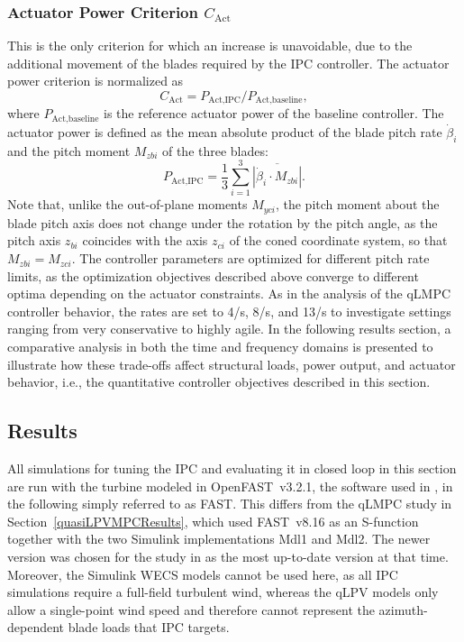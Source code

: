 \subsubsection*{Actuator Power Criterion $C_{\text{Act}}$}
This is the only criterion for which an increase is unavoidable, due to the additional movement of the blades required by the IPC controller. The actuator power criterion is normalized as
\begin{equation} \label{eq:CAct}
    C_{\text{Act}} = P_{\text{Act}, \text{IPC}}/P_{\text{Act}, \text{baseline}},
\end{equation}
where \( P_{\text{Act}, \text{baseline}} \) is the reference actuator power of the baseline controller. The actuator power is defined as the mean absolute product of the blade pitch rate $\dot{\beta}_i$ and the pitch moment $M_{zbi}$ of the three blades:
\begin{equation} \label{eq:CAct_calc}
    P_{\text{Act}, \text{IPC}} = \frac{1}{3} \sum_{i=1}^3 \overline{|\dot{\beta}_i \cdot M_{zbi}|}.
\end{equation}
%
Note that, unlike the out-of-plane moments $M_{yci}$, the pitch moment about the blade pitch axis does not change under the rotation by the pitch angle, as the pitch axis $z_{bi}$ coincides with the axis $z_{ci}$ of the coned coordinate system, so that $M_{zbi} = M_{zci}$.
The controller parameters are optimized for different pitch rate limits, as the optimization objectives described above converge to different optima depending on the actuator constraints. As in the analysis of the qLMPC controller behavior, the rates are set to 4\textdegree/s, 8\textdegree/s, and 13\textdegree/s to investigate settings ranging from very conservative to highly agile. In the following results section, a comparative analysis in both the time and frequency domains is presented to illustrate how these trade-offs affect structural loads, power output, and actuator behavior, i.e., the quantitative controller objectives described in this section.

\subsection{Results} \label{subsection: IPCResults}
All simulations for tuning the IPC and evaluating it in closed loop in this section are run with the turbine modeled in OpenFAST~v3.2.1, the software used in \cite{dittmer2024combined}, in the following simply referred to as FAST. This differs from the qLMPC study in Section~\ref{quasiLPVMPCResults}, which used FAST~v8.16 as an S-function together with the two Simulink implementations Mdl1 and Mdl2. The newer version was chosen for the study in \cite{dittmer2024combined} as the most up-to-date version at that time. Moreover, the Simulink WECS models cannot be used here, as all IPC simulations require a full-field turbulent wind, whereas the qLPV models only allow a single-point wind speed and therefore cannot represent the azimuth-dependent blade loads that IPC targets.

